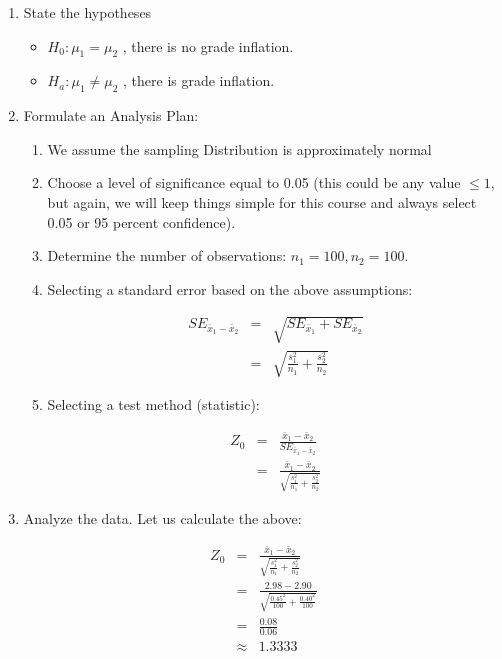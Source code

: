\documentclass[11pt]{book}\usepackage[]{graphicx}\usepackage[]{color}
\begin{document}
\begin{enumerate}
\item State the hypotheses
  \begin{itemize}
  \item $H_0: \mu_1 = \mu_2$ ,  there is no grade inflation. 
  \item $H_a: \mu_1 \ne \mu_2$ ,  there is  grade inflation. 
  \end{itemize}
\item Formulate an Analysis Plan:
  \begin{enumerate}
  \item We assume the sampling Distribution is approximately normal
  \item Choose a level of significance equal to 0.05 (this could be any value $\le 1$,  but again, we will keep things simple for this course and always select 0.05 or 95 percent confidence).
  \item Determine the number of observations: $n_1 = 100, n_2 = 100$. 
  \item Selecting a standard error based on the above assumptions:
  
  \begin{eqnarray*}
  SE_{\bar{x}_1 - \bar{x}_2} &=& \sqrt{ SE_{\bar{x}_1} + SE_{\bar{x}_2}} \\
   &=& \sqrt{ \frac{s_1^2}{n_1} + \frac{s_2^2}{n_2}}
   \end{eqnarray*} 
 
\item Selecting a test method (statistic):

  \begin{eqnarray*}
  Z_0 &=& \frac{ \bar{x}_1 - \bar{x}_2}{SE_{\bar{x}_1 - \bar{x}_2}} \\
  &=& \frac{ \bar{x}_1 - \bar{x}_2}{ \sqrt{ \frac{s_1^2}{n_1} + \frac{s_2^2}{n_2}} }
   \end{eqnarray*} 
 \end{enumerate}
 
\item Analyze the data. Let us calculate the above:

  \begin{eqnarray*}
  Z_0 &=& \frac{ \bar{x}_1 - \bar{x}_2}{ \sqrt{ \frac{s_1^2}{n_1} + \frac{s_2^2}{n_2}} } \\
    &=& \frac{ 2.98 - 2.90 }{ \sqrt{ \frac{0.45^2 }{100} + \frac{0.40^2}{100}}} \\
    &=& \frac{ 0.08}{0.06} \\
    &\approx& 1.3333 
   \end{eqnarray*} 
   

\end{enumerate}
\end{document}
